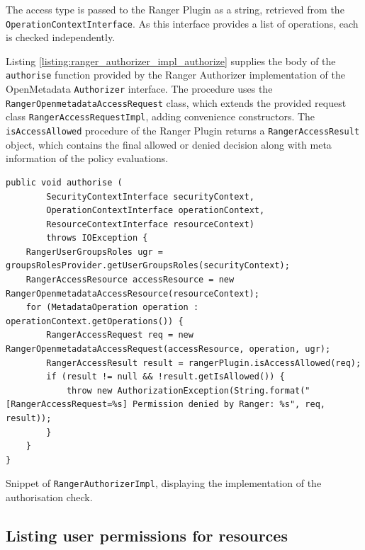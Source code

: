 The access type is passed to the Ranger Plugin as a string, retrieved from the \texttt{OperationContextInterface}. As this interface provides a list of operations, each is checked independently.

Listing \ref{listing:ranger_authorizer_impl_authorize} supplies the body of the \texttt{authorise} function provided by the Ranger Authorizer implementation of the OpenMetadata \texttt{Authorizer} interface. The procedure uses the \texttt{RangerOpenmetadataAccessRequest} class, which extends the provided request class \texttt{RangerAccessRequestImpl}, adding convenience constructors. The \texttt{isAccessAllowed} procedure of the Ranger Plugin returns a \texttt{RangerAccessResult} object, which contains the final allowed or denied decision along with meta information of the policy evaluations.

\begin{listing}

\begin{verbatim}
public void authorise (
        SecurityContextInterface securityContext,
        OperationContextInterface operationContext,
        ResourceContextInterface resourceContext)
        throws IOException {
    RangerUserGroupsRoles ugr = groupsRolesProvider.getUserGroupsRoles(securityContext);
    RangerAccessResource accessResource = new RangerOpenmetadataAccessResource(resourceContext);
    for (MetadataOperation operation : operationContext.getOperations()) {
        RangerAccessRequest req = new RangerOpenmetadataAccessRequest(accessResource, operation, ugr);
        RangerAccessResult result = rangerPlugin.isAccessAllowed(req);
        if (result != null && !result.getIsAllowed()) {
            throw new AuthorizationException(String.format("[RangerAccessRequest=%s] Permission denied by Ranger: %s", req, result));
        }
    }
}
\end{verbatim}

\caption{Snippet of \texttt{RangerAuthorizerImpl}, displaying the implementation of the authorisation check.}
\label{listing:ranger_authorizer_impl_authorize}
    
\end{listing}

\subsection{Listing user permissions for resources}

